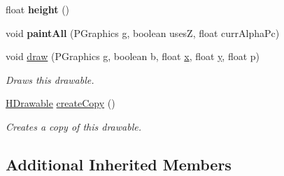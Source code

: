 \begin{DoxyCompactItemize}
\item 
\hypertarget{classhype_1_1core_1_1drawable_1_1_h_stage_a43b8ae2169c3b9df8714c9380b48cd67}{float {\bfseries height} ()}\label{classhype_1_1core_1_1drawable_1_1_h_stage_a43b8ae2169c3b9df8714c9380b48cd67}

\item 
\hypertarget{classhype_1_1core_1_1drawable_1_1_h_stage_a5c1e8468155f581d11c6cd93108f355a}{void {\bfseries paint\-All} (P\-Graphics g, boolean uses\-Z, float curr\-Alpha\-Pc)}\label{classhype_1_1core_1_1drawable_1_1_h_stage_a5c1e8468155f581d11c6cd93108f355a}

\item 
void \hyperlink{classhype_1_1core_1_1drawable_1_1_h_stage_a94a4f90ed568346075c188979ed7b257}{draw} (P\-Graphics g, boolean b, float \hyperlink{classhype_1_1core_1_1drawable_1_1_h_drawable_aecdbc8b9aa2e41f7e19d2b12f3f0d36e}{x}, float \hyperlink{classhype_1_1core_1_1drawable_1_1_h_drawable_ac7bcfc7a213f2b55cf8d0a6cd647442a}{y}, float p)
\begin{DoxyCompactList}\small\item\em Draws this drawable. \end{DoxyCompactList}\item 
\hyperlink{classhype_1_1core_1_1drawable_1_1_h_drawable}{H\-Drawable} \hyperlink{classhype_1_1core_1_1drawable_1_1_h_stage_a1133314946b11f9ff2008a4fa4dfd49e}{create\-Copy} ()
\begin{DoxyCompactList}\small\item\em Creates a copy of this drawable. \end{DoxyCompactList}\end{DoxyCompactItemize}
\subsection*{Additional Inherited Members}


